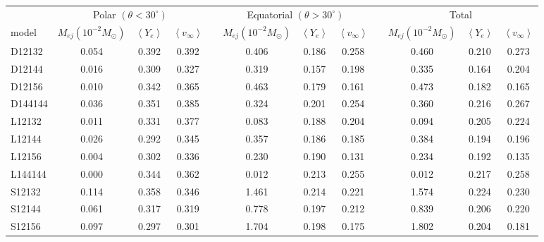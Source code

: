 \begin{table*}
\begin{adjustbox}{width={\textwidth},totalheight={\textheight},keepaspectratio}
\begin{tabular}{lccccccccccc}\toprule
& \multicolumn{3}{c}{Polar $(\theta < 30^\circ)$} & \phantom{abc}& \multicolumn{3}{c}{Equatorial $(\theta > 30^\circ)$} &
  \phantom{abc} & \multicolumn{3}{c}{Total}\\ \cmidrule{2-4}
\cmidrule{6-8} \cmidrule{10-12}
  model\quad\quad\quad\quad &  $M_{ej} (10^{-2}M_\odot)$ & $\left<Y_e\right>$ & $\left<v_\infty\right>$ && $M_{ej} (10^{-2}M_\odot)$ & $\left<Y_e\right>$ & $\left<v_\infty\right>$ && $M_{ej} (10^{-2}M_\odot)$ & $\left<Y_e\right>$ & $\left<v_\infty\right>$\\ \midrule
D12132 & 0.054 & 0.392 & 0.392 && 0.406 & 0.186 & 0.258 && 0.460 & 0.210 & 0.273\\
D12144 & 0.016 & 0.309 & 0.327 && 0.319 & 0.157 & 0.198 && 0.335 & 0.164 & 0.204\\
D12156 & 0.010 & 0.342 & 0.365 && 0.463 & 0.179 & 0.161 && 0.473 & 0.182 & 0.165\\
D144144 & 0.036 & 0.351 & 0.385 && 0.324 & 0.201 & 0.254 && 0.360 & 0.216 & 0.267\\
\midrule
L12132 & 0.011 & 0.331 & 0.377 && 0.083 & 0.188 & 0.204 && 0.094 & 0.205 & 0.224\\
L12144 & 0.026 & 0.292 & 0.345 && 0.357 & 0.186 & 0.185 && 0.384 & 0.194 & 0.196\\
L12156 & 0.004 & 0.302 & 0.336 && 0.230 & 0.190 & 0.131 && 0.234 & 0.192 & 0.135\\
L144144 & 0.000 & 0.344 & 0.362 && 0.012 & 0.213 & 0.255 && 0.012 & 0.217 & 0.258\\
\midrule
S12132 & 0.114 & 0.358 & 0.346 && 1.461 & 0.214 & 0.221 && 1.574 & 0.224 & 0.230\\
S12144 & 0.061 & 0.317 & 0.319 && 0.778 & 0.197 & 0.212 && 0.839 & 0.206 & 0.220\\
S12156 & 0.097 & 0.297 & 0.301 && 1.704 & 0.198 & 0.175 && 1.802 & 0.204 & 0.181\\

\end{tabular}
\end{adjustbox}
\end{table*}
